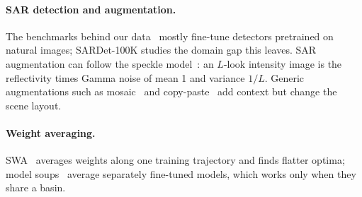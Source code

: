 \paragraph{SAR detection and augmentation.}
The benchmarks behind our data~\cite{li2024sardet,zhang2025rsar,wang2025m4sar,wei2020hrsid} mostly fine-tune
detectors pretrained on natural images; SARDet-100K studies the domain gap this leaves.
SAR augmentation can follow the speckle model~\cite{argenti2013speckle}: an $L$-look intensity image is the
reflectivity times Gamma noise of mean 1 and variance $1/L$.
Generic augmentations such as mosaic~\cite{bochkovskiy2020yolov4} and copy-paste~\cite{ghiasi2021copypaste} add
context but change the scene layout.

\paragraph{Weight averaging.}
SWA~\cite{izmailov2018swa} averages weights along one training trajectory and finds flatter optima; model
soups~\cite{wortsman2022soups} average separately fine-tuned models, which works only when they share a basin.
